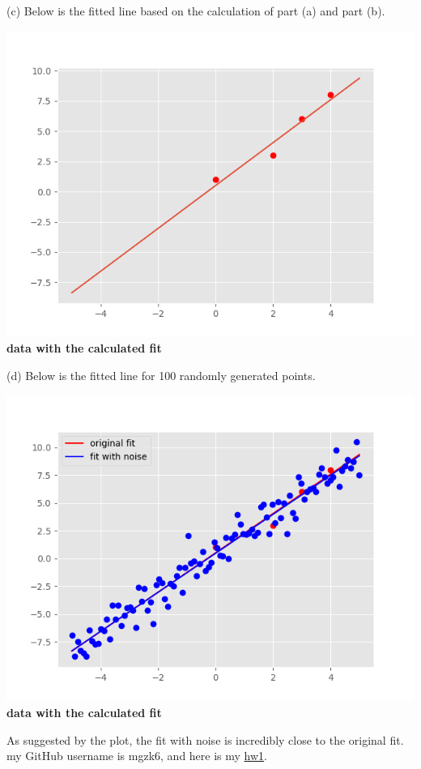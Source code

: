 \documentclass[12pt,letterpaper]{hmcpset}
\begin{document}
\begin{solution}
(c) Below is the fitted line based on the calculation of part (a) and part (b).
\begin{center}
\includegraphics[scale = .8]{hw1pr2c.png}\\
\textbf{data with the calculated fit}
\end{center}

(d) Below is the fitted line for 100 randomly generated points.
\begin{center}
\includegraphics[scale = .8]{hw1pr2d.png}\\
\textbf{data with the calculated fit}
\end{center}
As suggested by the plot, the fit with noise is incredibly close to the original fit.
\\

my GitHub username is mgzk6, and here is my \href{https://github.com/mgzk6/big_data_homework/tree/master/hw1}{hw1}.
\end{solution}

\newpage
\end{document}
